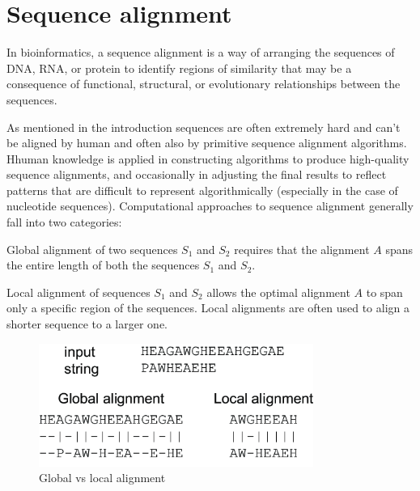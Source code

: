 \chapter{Sequence alignment}

\label{kap:sequence_alignment} %

In bioinformatics, a sequence alignment is a way of arranging the sequences of DNA, RNA, or protein
to identify regions of similarity that may be a consequence of functional, structural, or
evolutionary relationships between the sequences. \cite{Gollery2005BioinformaticsSA}

As mentioned in the introduction sequences are often extremely hard and can't be aligned by human
and often also by primitive sequence alignment algorithms. Hhuman knowledge is applied in
constructing algorithms to produce high-quality sequence alignments, and occasionally in adjusting
the final results to reflect patterns that are difficult to represent algorithmically (especially in
the case of nucleotide sequences). Computational approaches to sequence alignment generally fall
into two categories: 

\begin{theorem}
  Global alignment of two sequences $S_{1}$ and $S_{2}$ requires that the alignment $A$ spans the
  entire length of both the sequences $S_{1}$ and $S_{2}$.
\end{theorem}

\begin{theorem}
  Local alignment of sequences $S_{1}$ and $S_{2}$ allows the optimal alignment $A$ to span only a
  specific region of the sequences. Local alignments are often used to align a shorter sequence to 
  a larger one.
\end{theorem}

\begin{figure}[H]
  \centerline{\includegraphics[width=0.8\textwidth]{images/local_global_alignment.png}}
  \caption[Global vs local alignment]{Global vs local alignment}
  \label{obr:local_global_alignment}
\end{figure}

